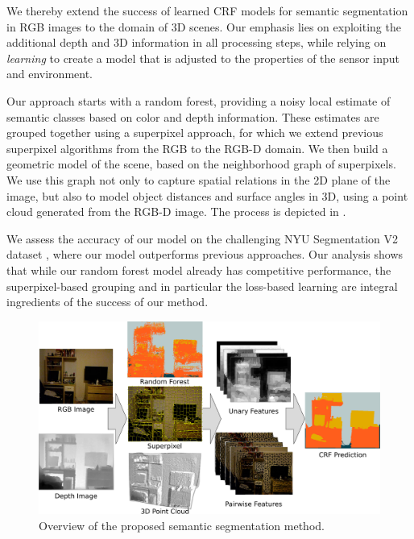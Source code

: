 \documentclass[a4paper, 10pt, conference]{ieeeconf}      %
\begin{document}
We thereby extend the success of learned CRF models for
semantic segmentation in RGB images to the domain of 3D scenes.
Our emphasis lies on exploiting the additional depth and 3D information in all
processing steps, while relying on \emph{learning} to create a model that 
is adjusted to the properties of the sensor input and environment.

Our approach starts with a random forest, providing a noisy local estimate
of semantic classes based on color and depth information. These estimates
are grouped together using a superpixel approach, for which we extend previous
superpixel algorithms from the RGB to the RGB-D domain.
We then build a geometric model of the scene, based on the neighborhood graph
of superpixels.  We use this graph not only to capture spatial relations in the
2D plane of the image, but also to model object distances and surface angles in
3D, using a point cloud generated from the RGB-D image. The process is depicted
in .

We assess the accuracy of our model on the challenging NYU Segmentation V2
dataset \citep{SilbermanECCV12}, where our model outperforms previous
approaches.  Our analysis shows that while our random forest model
already has competitive performance, the superpixel-based grouping and in
particular the loss-based learning are integral ingredients of the success of our method.

\begin{figure}
    \begin{center}
        \includegraphics[width=\linewidth]{images/teaser}
    \end{center}
    \caption{%
        Overview of the proposed semantic segmentation method.\label{teaser}
    }
\end{figure}
\end{document}
